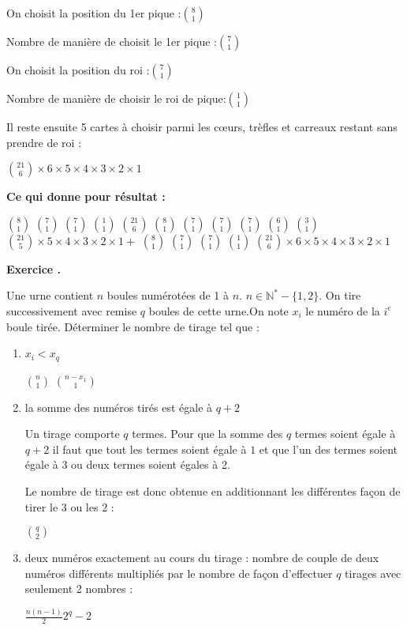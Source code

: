 \documentclass[a4paper,10pt]{article}
\newcounter{exercice}
\newcommand{\exercice}{%
		\refstepcounter{exercice}%
		\bigskip
		\bigskip
		\noindent\textbf{Exercice \theexercice.}~%
	}
\newcommand{\N}{\mathbb{N}}
\begin{document}
\begin{enumerate}
\begin{enumerate}
		On choisit la position du 1er pique :$\binom{8}{1}$
		
		Nombre de manière de choisit le 1er pique :$\binom{7}{1}$
		
		On choisit la position du roi :$\binom{7}{1}$
		
		Nombre de manière de choisir le roi de pique:$\binom{1}{1}$
		
		Il reste ensuite 5 cartes à choisir parmi les cœurs, trèfles et carreaux restant 				sans prendre de roi :
		
		$\binom{21}{6}\times 6\times 5\times 4\times 3\times 2\times 1$
		
		\textbf{Ce qui donne pour résultat :}
		
		$\binom{8}{1}$
		$\binom{7}{1}$
		$\binom{7}{1}$
		$\binom{1}{1}$
		$\binom{21}{6}$		
		$\binom{8}{1}$
		$\binom{7}{1}$
		$\binom{7}{1}$
		$\binom{7}{1}$
		$\binom{6}{1}$
		$\binom{3}{1}$
		$\binom{21}{5}\times5\times 4\times 3 \times 2\times1+$
		$\binom{8}{1}$
		$\binom{7}{1}$
		$\binom{7}{1}$
		$\binom{1}{1}$
		$\binom{21}{6}\times 6\times 5\times 4\times 3\times 2\times 1$
	
		
		\end{enumerate}
	\end{enumerate}
	
	\exercice
	Une urne contient $n$ boules numérotées de 1 à $n$. $n \in \N^*-\{1,2\}$. On tire successivement avec remise $q$ boules de cette urne.On note $x_i$ le numéro de la $i^e$ boule tirée. Déterminer le nombre de tirage tel que :
		\begin{enumerate}
		\item $x_i<x_q$ 
		\begin{center}
		$\binom{n}{1}$
		$\binom{n-x_1}{ 1}$
		 \end{center}
		\item la somme des numéros tirés est égale à $q+2$
		
		Un tirage comporte $q$ termes. Pour que la somme des $q$ termes soient égale à $q+2$ il faut que tout les termes soient égale à $1$ et que l'un des termes soient égale à 3 ou deux termes soient égales à 2.
		
		Le nombre de tirage est donc obtenue en additionnant les différentes façon de tirer le 3 ou les 2 :
		\begin{center}
			$\binom{q}{2}$
		 \end{center}
		\item deux numéros exactement au cours du tirage :
		nombre de couple de deux numéros différents  multipliés par le nombre de façon d'effectuer $q$ tirages avec seulement 2 nombres :
		\begin{center}
			$\frac{n(n-1)}{2}2^q-2 $
		 \end{center}
		
		\end{enumerate}
	 
\end{document}
